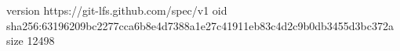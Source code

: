 version https://git-lfs.github.com/spec/v1
oid sha256:63196209bc2277cca6b8e4d7388a1e27c41911eb83c4d2c9b0db3455d3bc372a
size 12498
